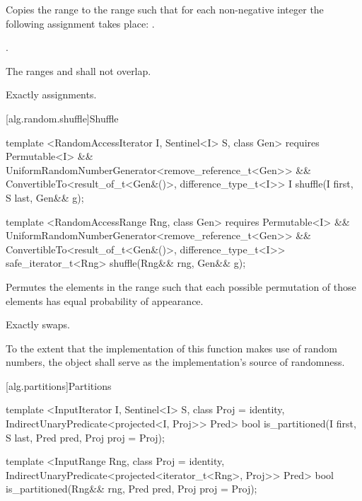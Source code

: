 \begin{itemdescr}
\pnum
\effects
Copies the range
to the range
such that for each non-negative integer
the following assignment takes place:
.

\pnum
\returns
{}.

\pnum
\requires
The ranges
and
shall not overlap.

\pnum
\complexity
Exactly
assignments.
\end{itemdescr}

[alg.random.shuffle]{Shuffle}

%
\begin{itemdecl}
template <RandomAccessIterator I, Sentinel<I> S, class Gen>
  requires Permutable<I> &&
    UniformRandomNumberGenerator<remove_reference_t<Gen>> &&
    ConvertibleTo<result_of_t<Gen&()>, difference_type_t<I>>
  I shuffle(I first, S last, Gen&& g);

template <RandomAccessRange Rng, class Gen>
  requires Permutable<I> &&
    UniformRandomNumberGenerator<remove_reference_t<Gen>> &&
    ConvertibleTo<result_of_t<Gen&()>, difference_type_t<I>>
  safe_iterator_t<Rng>
    shuffle(Rng&& rng, Gen&& g);
\end{itemdecl}

\begin{itemdescr}
\pnum
\effects
Permutes the elements in the range
such that each possible permutation of those elements has equal probability of appearance.

\pnum
\complexity
Exactly
swaps.

\pnum
\returns {}

\pnum
\notes
To the extent that the implementation of this function makes use of random
numbers, the object  shall serve as the implementation's source of
randomness.

\end{itemdescr}

[alg.partitions]{Partitions}

%
\begin{itemdecl}
template <InputIterator I, Sentinel<I> S, class Proj = identity,
    IndirectUnaryPredicate<projected<I, Proj>> Pred>
  bool is_partitioned(I first, S last, Pred pred, Proj proj = Proj{});

template <InputRange Rng, class Proj = identity,
    IndirectUnaryPredicate<projected<iterator_t<Rng>, Proj>> Pred>
  bool
    is_partitioned(Rng&& rng, Pred pred, Proj proj = Proj{});
\end{itemdecl}

